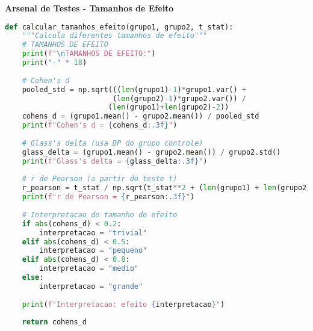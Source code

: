 \begin{examplebox}
\textbf{Arsenal de Testes - Tamanhos de Efeito}

\begin{lstlisting}[language=Python]
def calcular_tamanhos_efeito(grupo1, grupo2, t_stat):
    """Calcula diferentes tamanhos de efeito"""
    # TAMANHOS DE EFEITO
    print(f"\nTAMANHOS DE EFEITO:")
    print("-" * 18)
    
    # Cohen's d
    pooled_std = np.sqrt(((len(grupo1)-1)*grupo1.var() + 
                         (len(grupo2)-1)*grupo2.var()) / 
                        (len(grupo1)+len(grupo2)-2))
    cohens_d = (grupo1.mean() - grupo2.mean()) / pooled_std
    print(f"Cohen's d = {cohens_d:.3f}")
    
    # Glass's delta (usa DP do grupo controle)
    glass_delta = (grupo1.mean() - grupo2.mean()) / grupo2.std()
    print(f"Glass's delta = {glass_delta:.3f}")
    
    # r de Pearson (a partir do teste t)
    r_pearson = t_stat / np.sqrt(t_stat**2 + (len(grupo1) + len(grupo2) - 2))
    print(f"r de Pearson = {r_pearson:.3f}")
    
    # Interpretacao do tamanho do efeito
    if abs(cohens_d) < 0.2:
        interpretacao = "trivial"
    elif abs(cohens_d) < 0.5:
        interpretacao = "pequeno"
    elif abs(cohens_d) < 0.8:
        interpretacao = "medio"
    else:
        interpretacao = "grande"
    
    print(f"Interpretacao: efeito {interpretacao}")
    
    return cohens_d
\end{lstlisting}
\end{examplebox}

